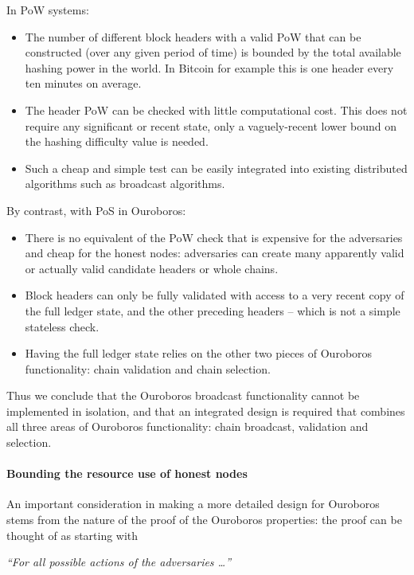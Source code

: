 \documentclass[11pt,a4paper]{article}
\begin{document}
In PoW systems:

\begin{itemize}
\item
  The number of different block headers with a valid PoW that can be
  constructed (over any given period of time) is bounded by the total
  available hashing power in the world. In Bitcoin for example this is
  one header every ten minutes on average.
\item
  The header PoW can be checked with little computational cost. This
  does not require any significant or recent state, only a
  vaguely-recent lower bound on the hashing difficulty value is needed.
\item
  Such a cheap and simple test can be easily integrated into existing
  distributed algorithms such as broadcast algorithms.
\end{itemize}

By contrast, with PoS in Ouroboros:

\begin{itemize}
\item
  There is no equivalent of the PoW check that is expensive for the
  adversaries and cheap for the honest nodes: adversaries can create
  many apparently valid or actually valid candidate headers or whole
  chains.
\item
  Block headers can only be fully validated with access to a very recent
  copy of the full ledger state, and the other preceding headers --
  which is not a simple stateless check.
\item
  Having the full ledger state relies on the other two pieces of
  Ouroboros functionality: chain validation and chain selection.
\end{itemize}

Thus we conclude that the Ouroboros broadcast functionality cannot be
implemented in isolation, and that an integrated design is required that
combines all three areas of Ouroboros functionality: chain broadcast,
validation and selection.

\paragraph{Bounding the resource use of honest nodes}

An important consideration in making a more detailed design for
Ouroboros stems from the nature of the proof of the Ouroboros
properties: the proof can be thought of as starting with

\emph{``For all possible actions of the adversaries \ldots{}'' }
\end{document}
